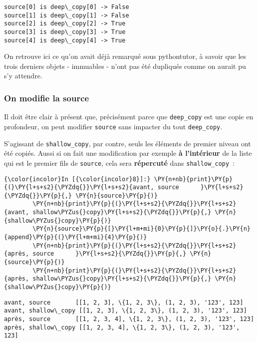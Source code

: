     \begin{Verbatim}[commandchars=\\\{\},frame=single,framerule=0.3mm,rulecolor=\color{cellframecolor}]
source[0] is deep\_copy[0] -> False
source[1] is deep\_copy[1] -> False
source[2] is deep\_copy[2] -> True
source[3] is deep\_copy[3] -> True
source[4] is deep\_copy[4] -> True
\end{Verbatim}

    On retrouve ici ce qu'on avait déjà remarqué sous pythontutor, à savoir
que les trois derniers objets - immuables - n'ont pas été dupliqués
comme on aurait pu s'y attendre.

    \hypertarget{on-modifie-la-source}{%
\subsubsection{On modifie la source}\label{on-modifie-la-source}}

    Il doit être clair à présent que, précisément parce que
\texttt{deep\_copy} est une copie en profondeur, on peut modifier
\texttt{source} sans impacter du tout \texttt{deep\_copy}.

    S'agissant de \texttt{shallow\_copy}, par contre, seuls les éléments de
premier niveau ont été copiés. Aussi si on fait une modification par
exemple \textbf{à l'intérieur} de la liste qui est le premier fils de
\texttt{source}, cela sera \textbf{répercuté} dans
\texttt{shallow\_copy}~:

    \begin{Verbatim}[commandchars=\\\{\},frame=single,framerule=0.3mm,rulecolor=\color{cellframecolor}]
{\color{incolor}In [{\color{incolor}8}]:} \PY{n+nb}{print}\PY{p}{(}\PY{l+s+s2}{\PYZdq{}}\PY{l+s+s2}{avant, source      }\PY{l+s+s2}{\PYZdq{}}\PY{p}{,} \PY{n}{source}\PY{p}{)}
        \PY{n+nb}{print}\PY{p}{(}\PY{l+s+s2}{\PYZdq{}}\PY{l+s+s2}{avant, shallow\PYZus{}copy}\PY{l+s+s2}{\PYZdq{}}\PY{p}{,} \PY{n}{shallow\PYZus{}copy}\PY{p}{)}
        \PY{n}{source}\PY{p}{[}\PY{l+m+mi}{0}\PY{p}{]}\PY{o}{.}\PY{n}{append}\PY{p}{(}\PY{l+m+mi}{4}\PY{p}{)}
        \PY{n+nb}{print}\PY{p}{(}\PY{l+s+s2}{\PYZdq{}}\PY{l+s+s2}{après, source      }\PY{l+s+s2}{\PYZdq{}}\PY{p}{,} \PY{n}{source}\PY{p}{)}
        \PY{n+nb}{print}\PY{p}{(}\PY{l+s+s2}{\PYZdq{}}\PY{l+s+s2}{après, shallow\PYZus{}copy}\PY{l+s+s2}{\PYZdq{}}\PY{p}{,} \PY{n}{shallow\PYZus{}copy}\PY{p}{)}
\end{Verbatim}


    \begin{Verbatim}[commandchars=\\\{\},frame=single,framerule=0.3mm,rulecolor=\color{cellframecolor}]
avant, source       [[1, 2, 3], \{1, 2, 3\}, (1, 2, 3), '123', 123]
avant, shallow\_copy [[1, 2, 3], \{1, 2, 3\}, (1, 2, 3), '123', 123]
après, source       [[1, 2, 3, 4], \{1, 2, 3\}, (1, 2, 3), '123', 123]
après, shallow\_copy [[1, 2, 3, 4], \{1, 2, 3\}, (1, 2, 3), '123', 123]
\end{Verbatim}

